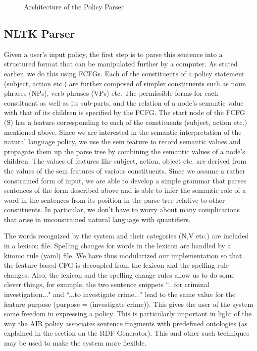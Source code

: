 \documentclass{llncs}
\begin{document}
\begin{figure}[!h]
  \centerline{}
  \caption{Architecture of the Policy Parser}
  \label{fig-architecture}
\end{figure}


\subsection{NLTK Parser}

Given a user's input policy, the first step is to parse this sentence into a structured format that can be manipulated further by a computer. As stated earlier, we do this using FCFGs. Each of the constituents of a policy statement (subject, action etc.) are further composed of simpler constituents such as noun phrases (NPs), verb phrases (VPs) etc. The permissible forms for each constituent as well as its sub-parts, and the relation of a node's semantic value with that of its children is specified by the FCFG. The start node of the FCFG (S) has a feature corresponding to each of the constituents (subject, action etc.) mentioned above. Since we are interested in the semantic interpretation of the natural language policy, we use the sem feature to record semantic values and propagate them up the parse tree by combining the semantic values of a node's children. The values of features like subject, action, object etc. are derived from the values of the sem features of various constituents. Since we assume a rather constrained form of input, we are able to develop a simple grammar that parses sentences of the form described above and is able to infer the semantic role of a word in the sentences from its position in the parse tree relative to other constituents. In particular, we don't have to worry about many complications that arise in unconstrained natural language with quantifiers.

The words recognized by the system and their categories (N,V etc.) are included in a lexicon file. Spelling changes for words in the lexicon are handled by a kimmo rule (yaml) file. We have thus modularized our implementation so that the feature-based CFG is decoupled from the lexicon and the spelling rule changes. Also, the lexicon and the spelling change rules allow us to do some clever things, for example, the two sentence snippets ``...for criminal investigation..." and ``...to investigate crime..." lead to the same value for the feature purpose (purpose = (investigate crime)). This gives the user of the system some freedom in expressing a policy. This is particularly important in light of the way the AIR policy associates sentence fragments with predefined ontologies (as explained in the section on the RDF Generator). This and other such techniques may be used to make the system more flexible.
\end{document}
